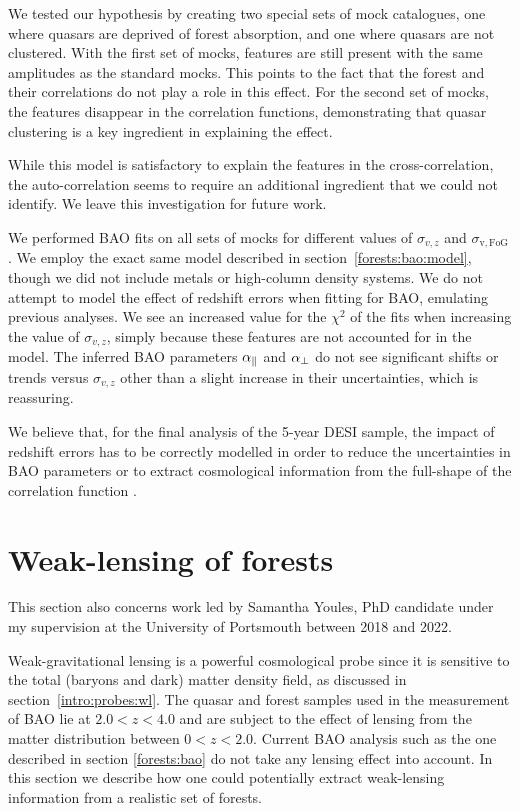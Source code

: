 We tested our hypothesis by creating two special sets of mock catalogues, one 
where quasars are deprived of forest absorption, and one where quasars are 
not clustered. With the first set of mocks, features are still present with the 
same amplitudes as the standard mocks. 
This points to the fact that the \lya forest and their correlations do not play 
a role in this effect. 
For the second set of mocks, the features disappear in the correlation functions, 
demonstrating that quasar clustering is a key ingredient in explaining the effect. 

While this model is satisfactory to explain the features in the cross-correlation, 
the auto-correlation seems to require an additional ingredient that we could not 
identify. We leave this investigation for future work. 

We performed BAO fits on all sets of mocks for different values of 
$\sigma_{v, z}$ and $\sigma_\mathrm{v, FoG}$. 
We employ the exact same model described in section~\ref{forests:bao:model}, 
though we did not include metals or high-column density systems. 
We do not attempt to model the effect of redshift errors when fitting for BAO,
emulating previous analyses.  
We see an increased value for the $\chi^2$ of the fits when increasing 
the value of $\sigma_{v, z}$, simply because these features are not accounted for in the model. 
The inferred BAO parameters ${\alpha_\parallel}$ and ${\alpha_\perp}$ do not see 
significant shifts or trends versus $\sigma_{v, z}$ other than a slight increase 
in their uncertainties, which is reassuring.  

We believe that, for the final analysis of the 5-year DESI sample, the impact 
of redshift errors has to be correctly modelled in order to reduce the 
uncertainties in BAO parameters or to extract cosmological information from  
the full-shape of the correlation function \cite{cuceuCosmologyBAO3D2021}.

\section{Weak-lensing of forests}
\label{forests:lensing}

This section also concerns work led by Samantha Youles, PhD candidate under 
my supervision at the University of Portsmouth between 2018 and 2022. 

Weak-gravitational lensing is a powerful cosmological probe since it is 
sensitive to the total (baryons and dark) matter density field, as 
discussed in section~\ref{intro:probes:wl}. The quasar and \lya forest 
samples used in the measurement of BAO lie at $2.0 < z < 4.0$ and are 
subject to the effect of lensing from the matter distribution between 
$0 < z < 2.0$. Current BAO analysis such as the one described in section
\ref{forests:bao} do not take any lensing effect into account. 
In this section we describe how one could potentially extract weak-lensing 
information from a realistic set of \lya forests. 


